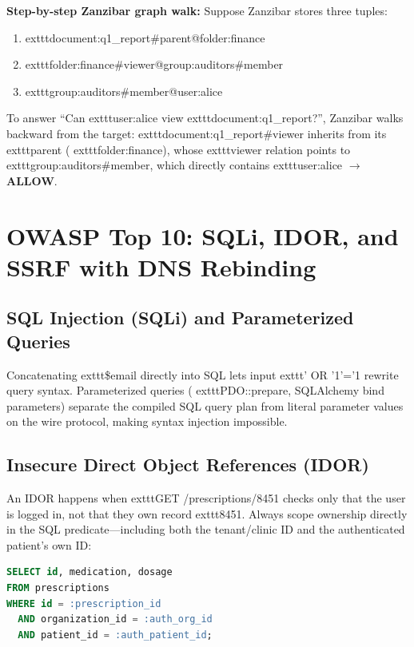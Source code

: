 \textbf{Step-by-step Zanzibar graph walk:} Suppose Zanzibar stores three tuples:
\begin{enumerate}[leftmargin=15pt]
  \item 	exttt{document:q1\_report\#parent@folder:finance}
  \item 	exttt{folder:finance\#viewer@group:auditors\#member}
  \item 	exttt{group:auditors\#member@user:alice}
\end{enumerate}
To answer ``Can 	exttt{user:alice} view 	exttt{document:q1\_report}?'', Zanzibar walks backward from the target: 	exttt{document:q1\_report\#viewer} inherits from its 	exttt{parent} (	exttt{folder:finance}), whose 	exttt{viewer} relation points to 	exttt{group:auditors\#member}, which directly contains 	exttt{user:alice} $\rightarrow$ \textbf{ALLOW}.

\section{OWASP Top 10: SQLi, IDOR, and SSRF with DNS Rebinding}

\subsection{SQL Injection (SQLi) and Parameterized Queries}
Concatenating 	exttt{\$email} directly into SQL lets input 	exttt{' OR '1'='1} rewrite query syntax. Parameterized queries (	exttt{PDO::prepare}, SQLAlchemy bind parameters) separate the compiled SQL query plan from literal parameter values on the wire protocol, making syntax injection impossible.

\subsection{Insecure Direct Object References (IDOR)}
An IDOR happens when 	exttt{GET /prescriptions/8451} checks only that the user is logged in, not that they own record 	exttt{8451}. Always scope ownership directly in the SQL predicate---including both the tenant/clinic ID and the authenticated patient's own ID:

\begin{lstlisting}[language=SQL,caption={Enforcing Both Tenant and Patient Ownership Against IDOR}]
SELECT id, medication, dosage
FROM prescriptions
WHERE id = :prescription_id
  AND organization_id = :auth_org_id
  AND patient_id = :auth_patient_id;
\end{lstlisting}

